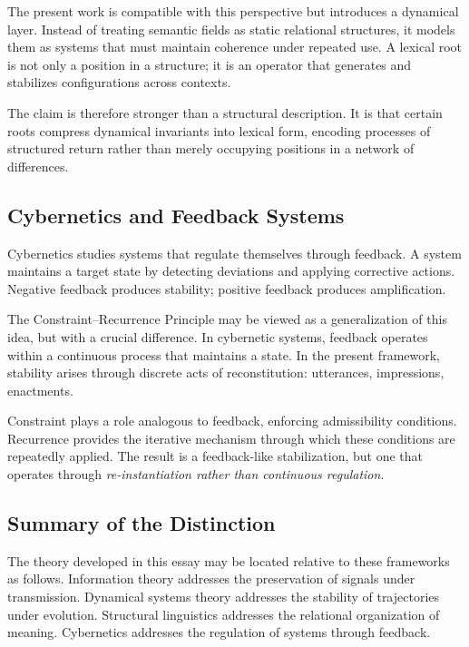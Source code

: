 \documentclass[12pt, oneside]{article}
\theoremstyle{definition}
\theoremstyle{remark}
\begin{document}
The present work is compatible with this perspective but introduces a dynamical layer.
Instead of treating semantic fields as static relational structures, it models them as systems that must maintain coherence under repeated use.
A lexical root is not only a position in a structure; it is an operator that generates and stabilizes configurations across contexts.

The claim is therefore stronger than a structural description.
It is that certain roots compress dynamical invariants into lexical form, encoding processes of structured return rather than merely occupying positions in a network of differences.

\subsection{Cybernetics and Feedback Systems}

Cybernetics studies systems that regulate themselves through feedback.
A system maintains a target state by detecting deviations and applying corrective actions.
Negative feedback produces stability; positive feedback produces amplification.

The Constraint--Recurrence Principle may be viewed as a generalization of this idea, but with a crucial difference.
In cybernetic systems, feedback operates within a continuous process that maintains a state.
In the present framework, stability arises through discrete acts of reconstitution: utterances, impressions, enactments.

Constraint plays a role analogous to feedback, enforcing admissibility conditions.
Recurrence provides the iterative mechanism through which these conditions are repeatedly applied.
The result is a feedback-like stabilization, but one that operates through \emph{re-instantiation rather than continuous regulation}.

\subsection{Summary of the Distinction}

The theory developed in this essay may be located relative to these frameworks as follows.
Information theory addresses the preservation of signals under transmission.
Dynamical systems theory addresses the stability of trajectories under evolution.
Structural linguistics addresses the relational organization of meaning.
Cybernetics addresses the regulation of systems through feedback.
\end{document}
